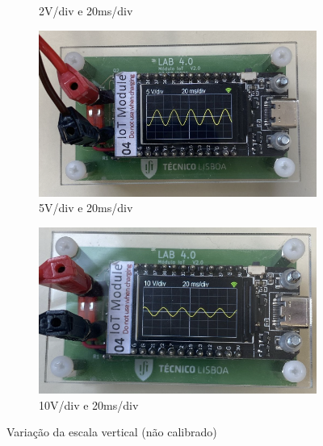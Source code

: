 \begin{figure}[H]
\begin{subfigure}{0.35\textwidth}
        \captionsetup{justification=centering}
        \caption{2V/div e 20ms/div}
        \label{fig:2V/div e 20ms/div não calibrado}
    \end{subfigure}
    \begin{subfigure}{0.35\textwidth}
        \centering
        \includegraphics[width=1\linewidth]{Imagens/Testes no laboratório/Não calibrado/Vertical 5V.png}
        \captionsetup{justification=centering}
        \caption{5V/div e 20ms/div}
        \label{fig:5V/div e 20ms/div não calibrado}
    \end{subfigure}
    \begin{subfigure}{0.35\textwidth}
        \centering
        \includegraphics[width=1\linewidth]{Imagens/Testes no laboratório/Não calibrado/Vertical 10V.png}
        \captionsetup{justification=centering}
        \caption{10V/div e 20ms/div}
        \label{fig:10V/div e 20ms/div vertical não calibrado}
    \end{subfigure}
    \captionsetup{justification=centering}
    \caption{Variação da escala vertical (não calibrado)}
    \label{fig:Variação da escala vertical (não calibrado)}
\end{figure}

